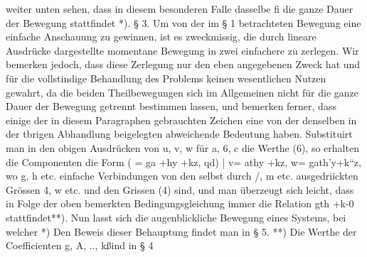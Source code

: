 \documentclass[11pt]{article}
\begin{document}
weiter unten sehen, dass in diesem besonderen Falle dasselbe fi die ganze Dauer der
Bewegung stattfindet *). § 3. Um von der im § 1 betrachteten Bewegung eine einfache
Anschauung zu gewinnen, ist es zweckmissig, die durch lineare Ausdrücke dargestellte
momentane Bewegung in zwei einfachere zu zerlegen. Wir bemerken jedoch, dass diese
Zerlegung nur den eben angegebenen Zweck hat und für die vollstindige Behandlung
des Problems keinen wesentlichen Nutzen gewahrt, da die beiden Theilbewegungen sich
im Allgemeinen nicht für die ganze Dauer der Bewegung getrennt bestimmen lassen, und
bemerken ferner, dass einige der in diesem Paragraphen gebrauchten Zeichen eine von
der denselben in der tbrigen Abhandlung beigelegten abweichende Bedeutung haben.
Substituirt man in den obigen Ausdrücken von u, v, w für a, 6, c die Werthe (6), so erhalten
die Componenten die Form ( = ga +hy +kz, qd) | v= athy +kz, w= gath’y+k“z, wo g,
h etc. einfache Verbindungen von den selbst durch /, m etc. ausgedriickten Grössen
4, w etc. und den Grissen (4) sind, und man überzeugt sich leicht, dass in Folge der
oben bemerkten Bedingungsgleichung immer die Relation gth +k-0 stattfindet**). Nun
lasst sich die augenblickliche Bewegung eines Systems, bei welcher *) Den Beweis dieser
Behauptung findet man in § 5. **) Die Werthe der Coeﬃcienten g, A, .., kßind in § 4
\end{document}
